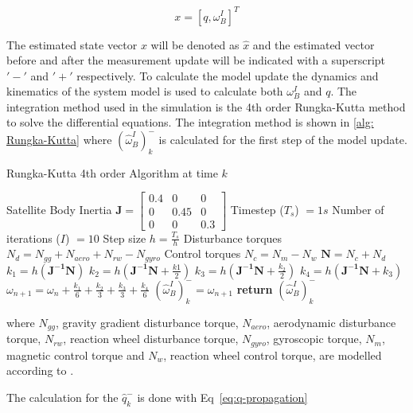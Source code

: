 \documentclass[letterpaper, 10 pt, conference]{ieeeconf}  %
\begin{document}
\begin{equation}
x = [q, \omega_B^I]^T
\end{equation}

The estimated state vector $x$ will be denoted as $\hat{x}$ and the estimated vector before and after the measurement update will be indicated with a superscript $'-'$ and $'+'$ respectively. To calculate the model update the dynamics and kinematics of the system model is used to calculate both $\omega_B^I$ and $q$. The integration method used in the simulation is the 4th order Rungka-Kutta method to solve the differential equations. The integration method is shown in \ref{alg: Rungka-Kutta} where $(\hat{\omega}_B^I)_k^-$ is calculated for the first step of the model update.

\begin{algorithm}[!htb]
	\caption[Rungka-Kutta]{Rungka-Kutta 4th order Algorithm at time $k$}
	\label{alg: Rungka-Kutta}
	\begin{algorithmic}[1]
		\State Satellite Body Inertia $\mathbf{J} = \begin{bmatrix}
						0.4 & 0 & 0\\
						0 & 0.45 & 0 \\
						0 & 0 & 0.3
						\end{bmatrix}$
		\State Timestep ($T_s$) $= 1s$
		\State Number of iterations ($I$) $= 10$
		\State Step size $h = \frac{T_s}{h}$
		\State Disturbance torques $N_d = N_{gg} + N_{aero} + N_{rw} - N_{gyro}$
		\State Control torques $N_c = N_m - N_w$
		\State $\mathbf{N} = N_c + N_d$
		\State \texttt{$k_1 = h(\mathbf{J^{-1}}\mathbf{N})$}
		\State \texttt{$k_2 = h(\mathbf{J^{-1}}\mathbf{N} + \frac{k1}{2})$}
		\State \texttt{$k_3 = h(\mathbf{J^{-1}}\mathbf{N} + \frac{k_2}{2})$}
		\State \texttt{$k_4 = h(\mathbf{J^{-1}}\mathbf{N} + k_3)$}
		\State \texttt{$\omega_{n+1}=\omega_n + \frac{k_1}{6} + \frac{k_2}{3} + \frac{k_3}{3} + \frac{k_4}{6}$}
		\EndFor
		\State $(\hat{\omega}_B^I)_k^- = \omega_{n+1}$
		\State \textbf{return} $(\hat{\omega}_B^I)_k^-$
	\end{algorithmic}
\end{algorithm}
where $N_{gg}$, gravity gradient disturbance torque, $N_{aero}$, aerodynamic disturbance torque, $N_{rw}$, reaction wheel disturbance torque, $N_{gyro}$, gyroscopic torque, $N_m$, magnetic control torque and $N_w$, reaction wheel control torque, are modelled according to \textcite{JansevanVuuren2015}. 

The calculation for the $\hat{q}_k^-$ is done with Eq~\ref{eq:q-propagation} \cite{JansevanVuuren2015}
\end{document}
